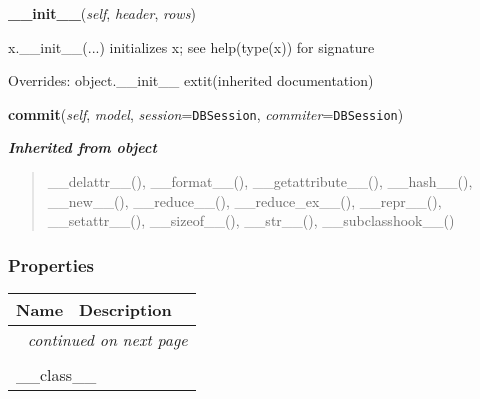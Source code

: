 \hspace{.8\funcindent}\begin{boxedminipage}{\funcwidth}

    \raggedright \textbf{\_\_init\_\_}(\textit{self}, \textit{header}, \textit{rows})

\setlength{\parskip}{2ex}
    x.\_\_init\_\_(...) initializes x; see help(type(x)) for signature

\setlength{\parskip}{1ex}
      Overrides: object.\_\_init\_\_ 	extit{(inherited documentation)}

    \end{boxedminipage}

    \label{test:Rows:commit}

    \vspace{0.5ex}

\hspace{.8\funcindent}\begin{boxedminipage}{\funcwidth}

    \raggedright \textbf{commit}(\textit{self}, \textit{model}, \textit{session}={\tt DBSession}, \textit{commiter}={\tt DBSession})

\setlength{\parskip}{2ex}
\setlength{\parskip}{1ex}
    \end{boxedminipage}


\large{\textbf{\textit{Inherited from object}}}

\begin{quote}
\_\_delattr\_\_(), \_\_format\_\_(), \_\_getattribute\_\_(), \_\_hash\_\_(), \_\_new\_\_(), \_\_reduce\_\_(), \_\_reduce\_ex\_\_(), \_\_repr\_\_(), \_\_setattr\_\_(), \_\_sizeof\_\_(), \_\_str\_\_(), \_\_subclasshook\_\_()
\end{quote}


  \subsubsection{Properties}

    \vspace{-1cm}
\hspace{\varindent}\begin{longtable}{|p{\varnamewidth}|p{\vardescrwidth}|l}
\cline{1-2}
\cline{1-2} \centering \textbf{Name} & \centering \textbf{Description}& \\
\cline{1-2}
\endhead\cline{1-2}\multicolumn{3}{r}{\small\textit{continued on next page}}\\\endfoot\cline{1-2}
\endlastfoot\multicolumn{2}{|l|}{\textit{Inherited from object}}\\
\multicolumn{2}{|p{\varwidth}|}{\raggedright \_\_class\_\_}\\
\cline{1-2}
\end{longtable}

